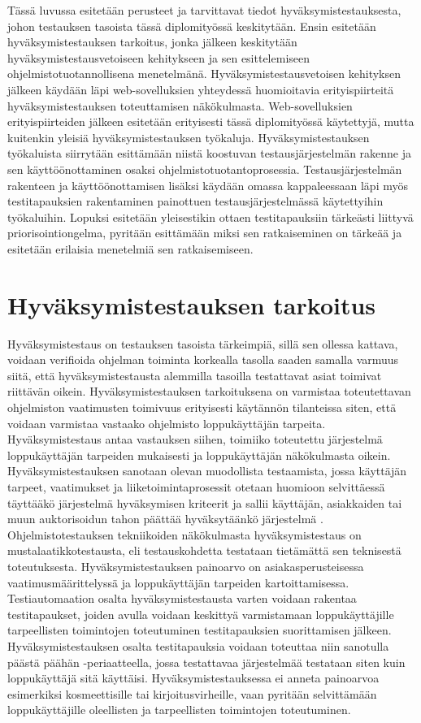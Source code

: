 Tässä luvussa esitetään perusteet ja tarvittavat tiedot hyväksymistestauksesta, johon testauksen tasoista tässä diplomityössä keskitytään.
Ensin esitetään hyväksymistestauksen tarkoitus, jonka jälkeen keskitytään hyväksymistestausvetoiseen kehitykseen ja sen esittelemiseen ohjelmistotuotannollisena menetelmänä.
Hyväksymistestausvetoisen kehityksen jälkeen käydään läpi web-sovelluksien yhteydessä huomioitavia erityispiirteitä hyväksymistestauksen toteuttamisen näkökulmasta.
Web-sovelluksien erityispiirteiden jälkeen esitetään erityisesti tässä diplomityössä käytettyjä, mutta kuitenkin yleisiä hyväksymistestauksen työkaluja.
Hyväksymistestauksen työkaluista siirrytään esittämään niistä koostuvan testausjärjestelmän rakenne ja sen käyttöönottaminen osaksi ohjelmistotuotantoprosessia.
Testausjärjestelmän rakenteen ja käyttöönottamisen lisäksi käydään omassa kappaleessaan läpi myös testitapauksien rakentaminen painottuen testausjärjestelmässä käytettyihin työkaluihin.
Lopuksi esitetään yleisestikin ottaen testitapauksiin tärkeästi liittyvä priorisointiongelma, pyritään esittämään miksi sen ratkaiseminen on tärkeää ja esitetään erilaisia menetelmiä sen ratkaisemiseen.

\section{Hyväksymistestauksen tarkoitus} \label{ch:08_hyvaksymistestauksen_tarkoitus}

  Hyväksymistestaus on testauksen tasoista tärkeimpiä, sillä sen ollessa kattava, voidaan verifioida ohjelman toiminta korkealla tasolla saaden samalla varmuus siitä, että hyväksymistestausta alemmilla tasoilla testattavat asiat toimivat riittävän oikein.
  Hyväksymistestauksen tarkoituksena on varmistaa toteutettavan ohjelmiston vaatimusten toimivuus erityisesti käytännön tilanteissa siten, että voidaan varmistaa vastaako ohjelmisto loppukäyttäjän tarpeita.
  Hyväksymistestaus antaa vastauksen siihen, toimiiko toteutettu järjestelmä loppukäyttäjän tarpeiden mukaisesti ja loppukäyttäjän näkökulmasta oikein.
  Hyväksymistestauksen sanotaan olevan muodollista testaamista, jossa käyttäjän tarpeet, vaatimukset ja liiketoimintaprosessit otetaan huomioon selvittäessä täyttääkö järjestelmä hyväksymisen kriteerit ja sallii käyttäjän, asiakkaiden tai muun auktorisoidun tahon päättää hyväksytäänkö järjestelmä \parencite{istqb_glossary_nodate}.
  Ohjelmistotestauksen tekniikoiden näkökulmasta hyväksymistestaus on mustalaatikkotestausta, eli testauskohdetta testataan tietämättä sen teknisestä toteutuksesta.
  Hyväksymistestauksen painoarvo on asiakasperusteisessa vaatimusmäärittelyssä ja loppukäyttäjän tarpeiden kartoittamisessa.
  Testiautomaation osalta hyväksymistestausta varten voidaan rakentaa testitapaukset, joiden avulla voidaan keskittyä varmistamaan loppukäyttäjille tarpeellisten toimintojen toteutuminen testitapauksien suorittamisen jälkeen.
  Hyväksymistestauksen osalta testitapauksia voidaan toteuttaa niin sanotulla päästä päähän -periaatteella, jossa testattavaa järjestelmää testataan siten kuin loppukäyttäjä sitä käyttäisi.
  Hyväksymistestauksessa ei anneta painoarvoa esimerkiksi kosmeettisille tai kirjoitusvirheille, vaan pyritään selvittämään loppukäyttäjille oleellisten ja tarpeellisten toimintojen toteutuminen.

